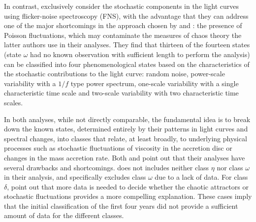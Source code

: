 \documentclass[fleqn,usenatbib]{mnras}
\begin{document}
In contrast, \citet{polyakov2012} exclusively consider the stochastic components in the light curves using 
flicker-noise spectroscopy (FNS), with the advantage that they can address one of the major shortcomings in the approach chosen by \citet{misra2004,misra2006} and 
\citet{harikrishnan2011}: the presence of Poisson fluctuations, which may contaminate the measures of chaos theory the latter authors use in their analyses.
They find that thirteen of the fourteen states (state $\omega$ had no known observation with sufficient length to perform the analysis) can be classified into 
four phenomenological states based on the characteristics of the stochastic contributions to the light curve: random noise, power-scale variability with a $1/f$ type 
power spectrum, one-scale variability with a single characteristic time scale and two-scale variability with two characteristic time scales. 

In both analyses, while not directly comparable, the fundamental idea is to break down the known states, determined entirely by their patterns in light curves and 
spectral changes, into classes that relate, at least broadly, to underlying physical processes such as stochastic fluctuations of viscosity in the accretion disc or 
changes in the mass accretion rate. Both \citet{harikrishnan2011} and \citet{polyakov2012} point out that their analyses have several drawbacks and shortcomings. 
\citet{harikrishnan2011} does not includes neither class $\eta$ nor class $\omega$ in their analysis, and \citet{polyakov2012} specifically excludes class $\omega$ due to 
a lack of data. For class $\delta$, \citet{polyakov2012} point out that more data is needed to decide whether the chaotic attractors or stochastic fluctuations 
provides a more compelling explanation. These cases imply that the initial classification of the first four years did not provide a sufficient amount of data for the 
different classes.
\end{document}

